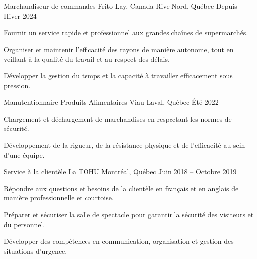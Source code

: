 
\begin{cventries}
	
	\cventry
	{Marchandiseur de commandes} %
	{Frito-Lay, Canada} %
	{Rive-Nord, Québec} %
	{Depuis Hiver 2024} %
	{
		\begin{cvitems}
			\item {Fournir un service rapide et professionnel aux grandes chaînes de supermarchés.}
			\item {Organiser et maintenir l’efficacité des rayons de manière autonome, tout en veillant à la qualité du travail et au respect des délais.}
			\item {Développer la gestion du temps et la capacité à travailler efficacement sous pression.}
		\end{cvitems}
	}
	
	\cventry
	{Manutentionnaire} %
	{Produits Alimentaires Viau} %
	{Laval, Québec} %
	{Été 2022} %
	{
		\begin{cvitems}
			\item {Chargement et déchargement de marchandises en respectant les normes de sécurité.}
			\item {Développement de la rigueur, de la résistance physique et de l’efficacité au sein d’une équipe.}
		\end{cvitems}
	}
	
	\cventry
	{Service à la clientèle} %
	{La TOHU} %
	{Montréal, Québec} %
	{Juin 2018 -- Octobre 2019} %
	{
		\begin{cvitems}
			\item {Répondre aux questions et besoins de la clientèle en français et en anglais de manière professionnelle et courtoise.}
			\item {Préparer et sécuriser la salle de spectacle pour garantir la sécurité des visiteurs et du personnel.}
			\item {Développer des compétences en communication, organisation et gestion des situations d’urgence.}
		\end{cvitems}
	}
	
\end{cventries}
